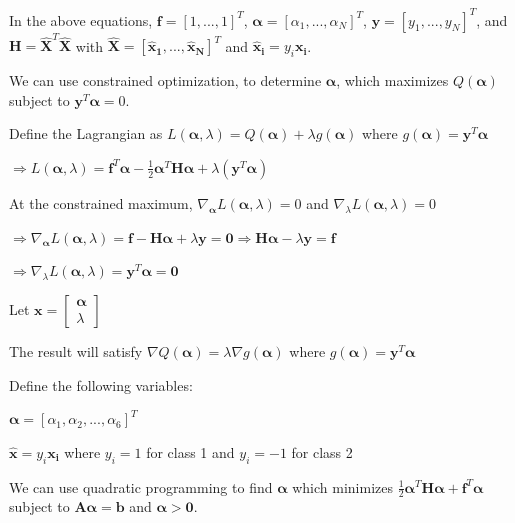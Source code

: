 \documentclass[fleqn]{article}
\begin{document}
\begin{enumerate}
\begin{enumerate}
		In the above equations, $\mathbf{f} = [1, ..., 1]^T$, $\boldsymbol{\alpha} = [\alpha_1, ..., \alpha_N]^T$, \newline $\mathbf{y} = [y_1,...,y_N]^T$, and $\mathbf{H} = \mathbf{\hat{X}}^T\mathbf{\hat{X}}$ with $\mathbf{\hat{X}} = [\mathbf{\hat{x}_1}, ..., \mathbf{\hat{x}_N}]^T$ \newline and $\mathbf{\hat{x}_i} = y_i\mathbf{x_i}$.

		We can use constrained optimization, to determine $\boldsymbol{\alpha}$, which \newline maximizes $Q(\boldsymbol{\alpha})$ subject to $\mathbf{y}^T\boldsymbol{\alpha} = 0$.
		
		Define the Lagrangian as $L(\boldsymbol{\alpha},\lambda) = Q(\boldsymbol{\alpha}) + \lambda g(\boldsymbol{\alpha})$ where $g(\boldsymbol{\alpha}) = \mathbf{y}^T\boldsymbol{\alpha}$
		
		$\Rightarrow L(\boldsymbol{\alpha},\lambda) = \mathbf{f}^T\boldsymbol{\alpha} - \frac{1}{2}\boldsymbol{\alpha}^T\mathbf{H}\boldsymbol{\alpha} + \lambda(\mathbf{y}^T\boldsymbol{\alpha})$
		
		At the constrained maximum, $\nabla_{\boldsymbol{\alpha}}L(\boldsymbol{\alpha},\lambda) = 0$ and $\nabla_{\lambda}L(\boldsymbol{\alpha},\lambda) = 0$ 
		
		$\Rightarrow \nabla_{\boldsymbol{\alpha}}L(\boldsymbol{\alpha},\lambda) = \mathbf{f} - \mathbf{H}\boldsymbol{\alpha} + \lambda\mathbf{y} = \mathbf{0} \Rightarrow \mathbf{H}\boldsymbol{\alpha} - \lambda\mathbf{y} = \mathbf{f}$
		
		$\Rightarrow \nabla_{\lambda}L(\boldsymbol{\alpha},\lambda) = \mathbf{y}^T\boldsymbol{\alpha} = \mathbf{0}$
		
		Let $\mathbf{x} = \begin{bmatrix} \boldsymbol{\alpha}\\ \lambda \end{bmatrix}$
		
		The result will satisfy $\nabla Q(\boldsymbol{\alpha}) = \lambda\nabla g(\boldsymbol{\alpha})$ where $g(\mathbf{\alpha}) = \mathbf{y}^T\boldsymbol{\alpha}$
		
		
		Define the following variables:
		
		$\boldsymbol{\alpha} = [\alpha_1, \alpha_2, ..., \alpha_6]^T$
		
		$\mathbf{\hat{x}} = y_i\mathbf{x_i}$ where $y_i = 1$ for class 1 and $y_i = -1$ for class 2
		
		We can use quadratic programming to find $\boldsymbol{\alpha}$ which minimizes \newline $\frac{1}{2}\boldsymbol{\alpha}^T\mathbf{H}\boldsymbol{\alpha} + \mathbf{f}^T\boldsymbol{\alpha}$ subject to $\mathbf{A}\boldsymbol{\alpha} = \mathbf{b}$ and $\boldsymbol{\alpha} > \mathbf{0}$.
		

\end{enumerate}
\end{enumerate}
\end{document}
